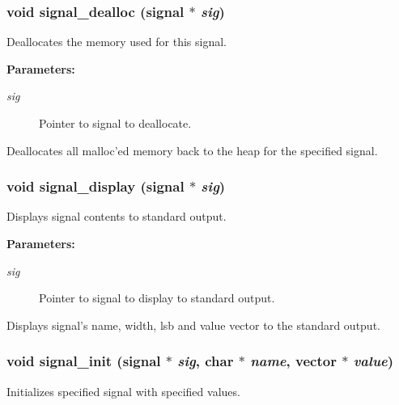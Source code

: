 \subsubsection{\setlength{\rightskip}{0pt plus 5cm}void signal\_\-dealloc ({\bf signal} $\ast$ {\em sig})}\label{signal_8h_a8}


Deallocates the memory used for this signal.

\begin{Desc}
\item[{\bf Parameters: }]\par
\begin{description}
\item[
{\em sig}]Pointer to signal to deallocate.

\end{description}
\end{Desc}
Deallocates all malloc'ed memory back to the heap for the specified signal. 
\subsubsection{\setlength{\rightskip}{0pt plus 5cm}void signal\_\-display ({\bf signal} $\ast$ {\em sig})}\label{signal_8h_a7}


Displays signal contents to standard output.

\begin{Desc}
\item[{\bf Parameters: }]\par
\begin{description}
\item[
{\em sig}]Pointer to signal to display to standard output.

\end{description}
\end{Desc}
Displays signal's name, width, lsb and value vector to the standard output. 
\subsubsection{\setlength{\rightskip}{0pt plus 5cm}void signal\_\-init ({\bf signal} $\ast$ {\em sig}, char $\ast$ {\em name}, {\bf vector} $\ast$ {\em value})}\label{signal_8h_a0}


Initializes specified signal with specified values.


